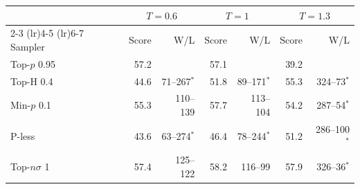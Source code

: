 \begin{tabular}{lrrrrrr}
\toprule
& \multicolumn{2}{c}{$T{=}0.6$} & \multicolumn{2}{c}{$T{=}1$} & \multicolumn{2}{c}{$T{=}1.3$} \\
\cmidrule(lr){2-3} \cmidrule(lr){4-5} \cmidrule(lr){6-7}
Sampler & Score & W/L & Score & W/L & Score & W/L \\
\midrule
Top-$p$ 0.95 & 57.2 &  & 57.1 &  & 39.2 &  \\
Top-H 0.4 & 44.6 & 71--267$^{*}$ & 51.8 & 89--171$^{*}$ & 55.3 & 324--73$^{*}$ \\
Min-$p$ 0.1 & 55.3 & 110--139 & 57.7 & 113--104 & 54.2 & 287--54$^{*}$ \\
P-less & 43.6 & 63--274$^{*}$ & 46.4 & 78--244$^{*}$ & 51.2 & 286--100$^{*}$ \\
Top-$n\sigma$ 1 & 57.4 & 125--122 & 58.2 & 116--99 & 57.9 & 326--36$^{*}$ \\
\bottomrule
\end{tabular}